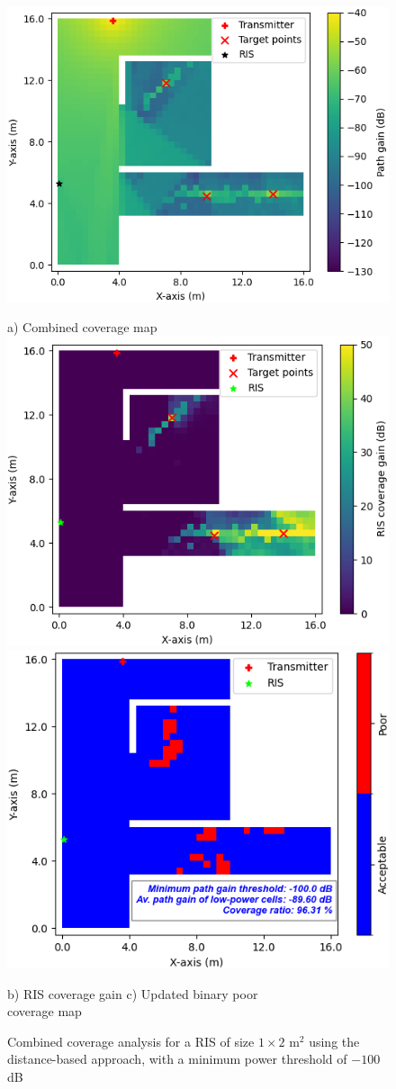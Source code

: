 \documentclass{IEEEoj}
\begin{document}
\begin{figure}
	\centering
	\includegraphics[width=0.8\linewidth]{Sim_Results/Comb_cov_1x2_Distance.png}
	
	a) Combined coverage map \\[5pt]
	
	\includegraphics[width=0.49\linewidth]{Sim_Results/RIS_cov_gain_1x2_Distance.png}
	\hfill
	\includegraphics[width=0.48\linewidth]{Sim_Results/New_Binary_Cov_Map_1x2_Distance.png}
	
	\hspace{10pt} b) RIS coverage gain \hspace{30pt} c) Updated binary poor \\ \hspace{140pt} coverage map
	\caption{Combined coverage analysis for a RIS of size $1 \times 2$ m$^2$ using the distance-based approach, with a minimum power threshold of $-100$ dB}
	\label{comb_cov_distance}
\end{figure}
\end{document}
